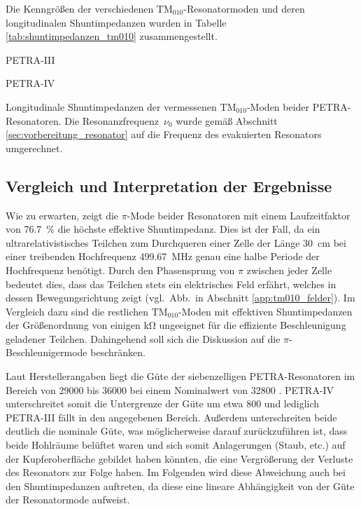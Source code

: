 Die Kenngrößen der verschiedenen $\mathrm{TM}_{010}$-Resonatormoden und deren longitudinalen Shuntimpedanzen wurden in Tabelle \ref{tab:shuntimpedanzen_tm010} zusammengestellt.
\begin{table}[htb]
	\begin{subtable}{1\textwidth}
		\centering
		
		\caption{PETRA-III}
	\end{subtable}
	\begin{subtable}{1\textwidth}
		\centering
		
		\caption{PETRA-IV}
	\end{subtable}
	\caption{Longitudinale Shuntimpedanzen der vermessenen $\mathrm{TM}_{010}$-Moden beider PETRA-Resonatoren. Die Resonanzfrequenz~$\nu_0$ wurde gemäß Abschnitt \ref{sec:vorbereitung_resonator} auf die Frequenz des evakuierten Resonators umgerechnet.}
	\label{tab:shuntimpedanzen_tm010}
\end{table}

\subsection{Vergleich und Interpretation der Ergebnisse}
Wie zu erwarten, zeigt die $\pi$-Mode beider Resonatoren mit einem Laufzeitfaktor von \SI{76,7}{\percent} die höchste effektive Shuntimpedanz.
Dies ist der Fall, da ein ultrarelativistisches Teilchen zum Durchqueren einer Zelle der Länge \SI{30}{\centi\metre} bei einer treibenden Hochfrequenz \SI{499.67}{MHz} genau eine halbe Periode der Hochfrequenz benötigt.
Durch den Phasensprung von $\pi$ zwischen jeder Zelle bedeutet dies, dass das Teilchen stets ein elektrisches Feld erfährt, welches in dessen Bewegungsrichtung zeigt (vgl.\ Abb.\ in Abschnitt \ref{app:tm010_felder}).
Im Vergleich dazu sind die restlichen $\mathrm{TM}_{010}$-Moden mit effektiven Shuntimpedanzen der Größenordnung von einigen \si{\kilo\ohm} ungeeignet für die effiziente Beschleunigung geladener Teilchen.
Dahingehend soll sich die Diskussion auf die $\pi$-Beschleunigermode beschränken.

Laut Herstellerangaben liegt die Güte der siebenzelligen PETRA-Resonatoren im Bereich von \num{29000} bis \num{36000} bei einem Nominalwert von \num{32800} \cite{desy_petra}.
PETRA-IV unterschreitet somit die Untergrenze der Güte um etwa \num{800} und lediglich PETRA-III fällt in den angegebenen Bereich.
Außerdem unterschreiten beide deutlich die nominale Güte, was möglicherweise darauf zurückzuführen ist, dass beide Hohlräume belüftet waren und sich somit Anlagerungen (Staub, etc.) auf der Kupferoberfläche gebildet haben könnten, die eine Vergrößerung der Verluste des Resonators zur Folge haben.
Im Folgenden wird diese Abweichung auch bei den Shuntimpedanzen auftreten, da diese eine lineare Abhängigkeit von der Güte der Resonatormode aufweist.

